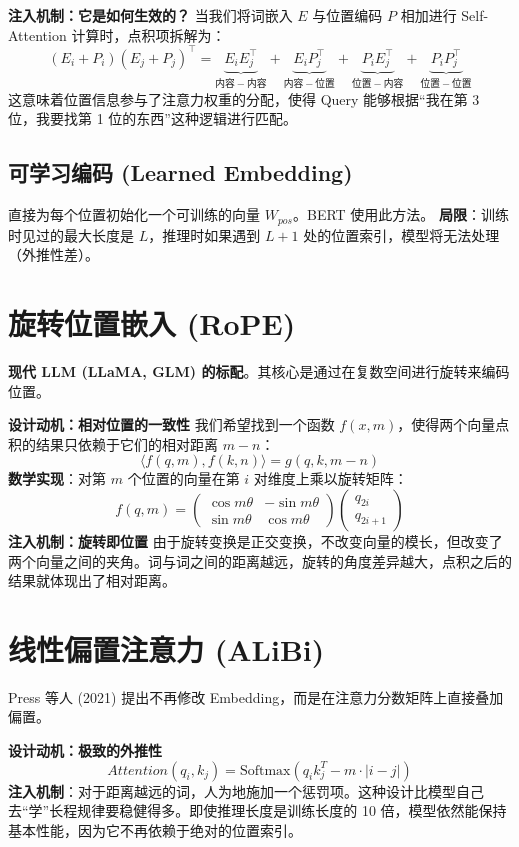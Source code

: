 \documentclass[12pt, a4paper]{book}
\begin{document}
\textbf{注入机制：它是如何生效的？}
当我们将词嵌入 $E$ 与位置编码 $P$ 相加进行 Self-Attention 计算时，点积项拆解为：
$$ (E_i + P_i)(E_j + P_j)^\top = \underbrace{E_i E_j^\top}_{内容-内容} + \underbrace{E_i P_j^\top}_{内容-位置} + \underbrace{P_i E_j^\top}_{位置-内容} + \underbrace{P_i P_j^\top}_{位置-位置} $$
这意味着位置信息参与了注意力权重的分配，使得 Query 能够根据“我在第 3 位，我要找第 1 位的东西”这种逻辑进行匹配。

\subsection{可学习编码 (Learned Embedding)}
直接为每个位置初始化一个可训练的向量 $W_{pos}$。BERT 使用此方法。
\textbf{局限}：训练时见过的最大长度是 $L$，推理时如果遇到 $L+1$ 处的位置索引，模型将无法处理（外推性差）。

\section{旋转位置嵌入 (RoPE)}
\textbf{现代 LLM (LLaMA, GLM) 的标配}。其核心是通过在复数空间进行旋转来编码位置。

\textbf{设计动机：相对位置的一致性}
我们希望找到一个函数 $f(x, m)$，使得两个向量点积的结果只依赖于它们的相对距离 $m-n$：
$$ \langle f(q, m), f(k, n) \rangle = g(q, k, m-n) $$
\textbf{数学实现}：对第 $m$ 个位置的向量在第 $i$ 对维度上乘以旋转矩阵：
$$ f(q, m) = \begin{pmatrix} \cos m\theta & -\sin m\theta \\ \sin m\theta & \cos m\theta \end{pmatrix} \begin{pmatrix} q_{2i} \\ q_{2i+1} \end{pmatrix} $$
\textbf{注入机制：旋转即位置}
由于旋转变换是正交变换，不改变向量的模长，但改变了两个向量之间的夹角。词与词之间的距离越远，旋转的角度差异越大，点积之后的结果就体现出了相对距离。

\section{线性偏置注意力 (ALiBi)}
Press 等人 (2021) 提出不再修改 Embedding，而是在注意力分数矩阵上直接叠加偏置。

\textbf{设计动机：极致的外推性}
$$ Attention(q_i, k_j) = \text{Softmax}(q_i k_j^T - m \cdot |i - j|) $$
\textbf{注入机制}：对于距离越远的词，人为地施加一个惩罚项。这种设计比模型自己去“学”长程规律要稳健得多。即使推理长度是训练长度的 10 倍，模型依然能保持基本性能，因为它不再依赖于绝对的位置索引。
\end{document}

